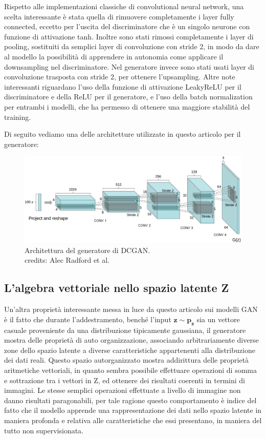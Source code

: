 Rispetto alle implementazioni classiche di convolutional neural network, una scelta interessante è stata quella di rimuovere completamente 
i layer fully connected, eccetto per l'uscita del discriminatore che è un singolo neurone con funzione di attivazione tanh.
Inoltre sono stati rimossi completamente i layer di pooling, sostituiti da semplici layer di convoluzione con stride 2, in modo da dare al modello
la possibilità di apprendere in autonomia come applicare il downsampling nel discriminatore. Nel generatore invece sono stati usati layer di
convoluzione trasposta con stride 2, per ottenere l'upsampling.
Altre note interessanti riguardano l'uso della funzione di attivazione LeakyReLU per il discriminatore e della ReLU per il generatore, e l'uso
della batch normalization per entrambi i modelli, che ha permesso di ottenere una maggiore stabilità del training.

Di seguito vediamo una delle architetture utilizzate in questo articolo per il generatore:

    \begin{figure}[H]
        \centering
        \includegraphics[width=1.0\textwidth]{imgs/DCGAN_generator.png}
        \caption{Architettura del generatore di DCGAN.\\
        credits: Alec Radford et al. \cite{radford2016unsupervised}}
        \label{fig:DCGAN_generator}
    \end{figure}

\subsection{L'algebra vettoriale nello spazio latente Z}
Un'altra proprietà interessante messa in luce da questo articolo sui modelli GAN è il fatto che durante l'addestramento, benché l'input 
$\mathbf{z} \sim \mathbf{p_{z}}$ sia un vettore casuale proveniente da una distribuzione tipicamente gaussiana, il generatore
mostra delle proprietà di auto organizzazione, associando arbitrariamente diverse zone dello spazio latente a diverse caratteristiche 
appartenenti alla distribuzione dei dati reali.
Questo spazio autorganizzato mostra addirittura delle proprietà aritmetiche vettoriali, in quanto sembra possibile effettuare 
operazioni di somma e sottrazione tra i vettori in Z, ed ottenere dei risultati coerenti in termini di immagini. Le stesse semplici operazioni 
effettuate a livello di immagine non danno risultati paragonabili, per tale ragione questo comportamento è indice del fatto che il modello
apprende una rappresentazione dei dati nello spazio latente in maniera profonda e relativa alle caratteristiche che essi presentano, in 
maniera del tutto non supervisionata.

